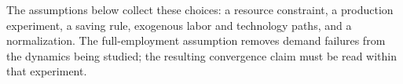 The assumptions below collect these choices: a resource constraint, a
production experiment, a saving rule, exogenous labor and technology paths,
and a normalization. The full-employment assumption removes demand failures
from the dynamics being studied; the resulting convergence claim must be read
within that experiment.

%
%
%
%
%
%
%
%
%
%
%
%
%
